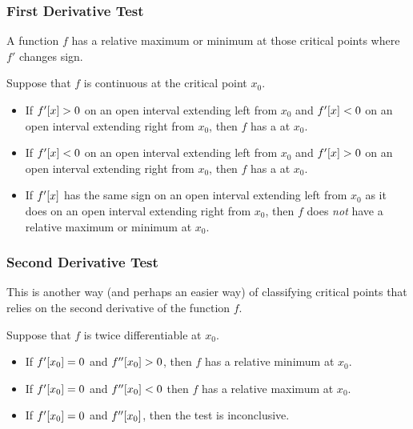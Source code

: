 \subsubsection{First Derivative Test} 
A function $f$ has a relative maximum or minimum at those critical points where $f'$ changes sign.

Suppose that $f$ is continuous at the critical point $x_0$.
%
\begin{itemize}
\item If $f'\!\left[{x}\right] > 0$ on an open interval extending left from $x_0$ and $f'\!\left[{x}\right] < 0$ on an open interval extending right from $x_0$, then $f$ has a  at $x_0$.
%
\item If $f'\!\left[{x}\right] < 0$ on an open interval extending left from $x_0$ and $f'\!\left[{x}\right] > 0$ on an open interval extending right from $x_0$, then $f$ has a  at $x_0$.
%
\item If $f'\!\left[{x}\right]$ has the same sign on an open interval extending left from $x_0$ as it does on an open interval extending right from $x_0$, then $f$ does \emph{not} have a relative maximum or minimum at $x_0$.
\end{itemize}


\subsubsection{Second Derivative Test}
This is another way (and perhaps an easier way) of classifying critical points that relies on the second derivative of the function $f$.

Suppose that $f$ is twice differentiable at $x_0$.
\begin{itemize}
\item If $f'\!\left[{x_0}\right] = 0$ and $f''\!\left[{x_0}\right] > 0$, then $f$ has a relative minimum at $x_0$. 
%
\item If $f'\!\left[{x_0}\right] = 0$ and $f''\!\left[{x_0}\right] < 0$ then $f$ has a relative maximum at $x_0$. 
%
\item If $f'\!\left[{x_0}\right] = 0$ and $f''\!\left[{x_0}\right]$, then the test is inconclusive.
%
\end{itemize}


